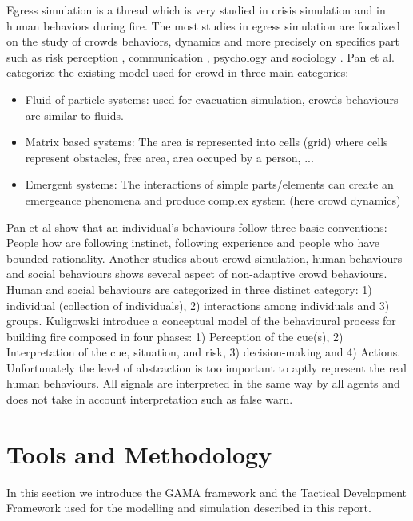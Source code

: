 \documentclass[12pt, a4paper]{memoir} %
\begin{document}
		Egress simulation is a thread which is very studied in crisis simulation and in human behaviors during fire.
		The most studies in egress simulation are focalized on the study of crowds behaviors, dynamics and more precisely on specifics part
		such as risk perception \cite{kinateder2014,mu2013}, communication \cite{pelechano2005}, psychology \cite{pelechano2005,kuligowski2008} and sociology \cite{pan2006,pan2007}.
		Pan et al. \cite{pan2007} categorize the existing model used for crowd in three main categories:
		\begin{itemize}
			\item Fluid of particle systems: used for evacuation simulation, crowds behaviours are similar to fluids.\cite{low2000, helbing2000}
			\item Matrix based systems: The area is represented into cells (grid) where cells represent obstacles, free area, area occuped by a person, ...
			\item Emergent systems: The interactions of simple parts/elements can create an emergeance phenomena and produce complex system (here crowd dynamics)
		\end{itemize}
		Pan et al show that an individual's behaviours follow three basic conventions\cite{pan2006}:
		People how are following instinct, following experience and people who have bounded rationality.
		Another studies about crowd simulation, human behaviours and social behaviours shows several aspect of non-adaptive crowd behaviours.
		Human and social behaviours are categorized in three distinct category: 1) individual (collection of individuals), 2) interactions among individuals and 3) groups. \cite{pan2006}
		Kuligowski introduce a conceptual model of the behavioural process for building fire composed in four phases: 1) Perception of the cue(s), 2) Interpretation of the cue, situation, and risk, 3) decision-making and 4) Actions.
		Unfortunately the level of abstraction is too important to aptly represent the real human behaviours.
		All signals are interpreted in the same way by all agents and does not take in account interpretation such as false warn\cite{kuligowski2008}.

\chapter{Tools and Methodology}

	In this section we introduce the GAMA framework and the Tactical Development Framework used for the modelling and simulation described in this report.
\end{document}
